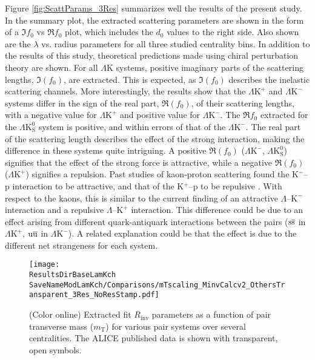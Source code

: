 \documentclass[ALICE,manyauthors]{cernphprep}
\newcommand{\ResultsDirBaseLamKch}{/home/jesse/Analysis/FemtoAnalysis/Results/Results_cLamcKch_20180505/}
\newcommand{\MomRes}{_MomResCrctn}%
\newcommand{\NonFlatBgdLamKch}{_NonFlatBgdCrctnLamK0LamKchPolynomial}
\newcommand{\ResNum}{_3Res}
\newcommand{\PrimMaxDecay}{_PrimMaxDecay10fm}
\newcommand{\ResMethod}{_UsingXiDataAndCoulombOnly}
\newcommand{\ParamFixAndShareLamKch}{_ShareLam_Dualie_ShareLam_ShareRadii}
\newcommand{\SaveNameModLamKch}{\MomRes\NonFlatBgdLamKch\ResNum\PrimMaxDecay\ResMethod\ParamFixAndShareLamKch}
\newcommand{\mt}{$m_{\mathrm{T}}$\xspace}
\newcommand{\Lam}{$\Lambda$\xspace}
\newcommand{\KchP}{$\mathrm{K^{+}}$\xspace}
\newcommand{\KchM}{$\mathrm{K^{-}}$\xspace}
\newcommand{\LamK}{$\Lambda$K\xspace}
\newcommand{\LamKchP}{$\Lambda\mathrm{K^{+}}$\xspace}
\newcommand{\LamKchM}{$\Lambda\mathrm{K^{-}}$\xspace}
\newcommand{\LamKs}{$\Lambda\mathrm{K^{0}_{S}}$\xspace}
\begin{document}
Figure \ref{fig:ScattParams_3Res} summarizes well the results of the present study.
In the summary plot, the extracted scattering parameters are shown in the form of a $\Im f_{0}$ vs $\Re f_{0}$ plot, which includes the $d_{0}$ values to the right side.  
Also shown are the $\lambda$ vs. radius parameters for all three studied centrality bins. 
In addition to the results of this study, theoretical predictions made using chiral perturbation theory \cite{Liu:2006xja,Mai:2009ce} are shown.
For all \LamK systems, positive imaginary parts of the scattering lengths, $\Im(f_{0})$, are extracted. 
This is expected, as $\Im(f_{0})$ describes the inelastic scattering channels.
More interestingly, the results show that the \LamKchP and \LamKchM systems differ in the sign of the real part, $\Re(f_{0})$, of their scattering lengths, with a negative value for \LamKchP and positive value for \LamKchM.
The $\Re f_{0}$ extracted for the \LamKs system is positive, and within errors of that of the \LamKchM. 
The real part of the scattering length describes the effect of the strong interaction, making the difference in these systems quite intriguing.
A positive $\Re(f_{0})$ (\LamKchM, \LamKs) signifies that the effect of the strong force is attractive, while a negative $\Re(f_{0})$ (\LamKchP) signifies a repulsion.
Past studies of kaon-proton scattering found the K$^{-}$--p interaction to be attractive, and that of the K$^{+}$--p to be repulsive \cite{Humphrey:1962zz, Hadjimichef:2002xe, Ikeda:2012au}.
With respect to the kaons, this is similar to the current finding of an attractive \Lam--\KchM interaction and a repulsive \Lam--\KchP interaction.
This difference could be due to an effect arising from different quark-antiquark interactions between the pairs ($\rm s\overline{s}$ in \LamKchP, $\rm u\overline{u}$ in \LamKchM).
A related explanation could be that the effect is due to the different net strangeness for each system.


\begin{figure}[h]
  \centering
  \texttt{[image: \\ResultsDirBaseLamKch\\SaveNameModLamKch/Comparisons/mTscaling\_MinvCalcv2\_OthersTransparent\_3Res\_NoResStamp.pdf]}
  \caption[\mt Scaling of Radii: 3 Residuals in Fit]
  {
  (Color online) Extracted fit $R_{\mathrm{inv}}$ parameters as a function of pair transverse mass (\mt) for various pair systems over several centralities. 
  The ALICE published data \cite{Adam:2015vja} is shown with transparent, open symbols.
  }
  \label{fig:mTScalingOfRadii_3Res}
\end{figure}
\end{document}
